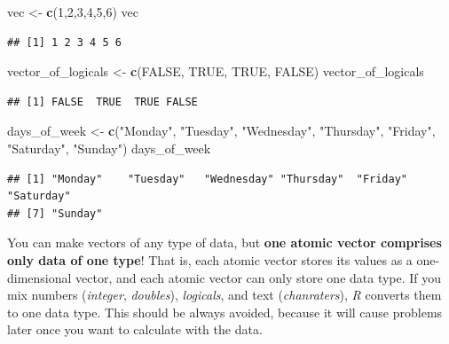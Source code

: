 \documentclass[
]{scrartcl}
\newenvironment{Shaded}{\begin{snugshade}}{\end{snugshade}}
\newcommand{\DecValTok}[1]{\textcolor[rgb]{0.00,0.00,0.81}{#1}}
\newcommand{\KeywordTok}[1]{\textcolor[rgb]{0.13,0.29,0.53}{\textbf{#1}}}
\newcommand{\NormalTok}[1]{#1}
\newcommand{\OtherTok}[1]{\textcolor[rgb]{0.56,0.35,0.01}{#1}}
\newcommand{\StringTok}[1]{\textcolor[rgb]{0.31,0.60,0.02}{#1}}
\begin{document}
\begin{Shaded}
\begin{Highlighting}[]
\NormalTok{vec \textless{}{-}}\StringTok{ }\KeywordTok{c}\NormalTok{(}\DecValTok{1}\NormalTok{,}\DecValTok{2}\NormalTok{,}\DecValTok{3}\NormalTok{,}\DecValTok{4}\NormalTok{,}\DecValTok{5}\NormalTok{,}\DecValTok{6}\NormalTok{)}
\NormalTok{vec}
\end{Highlighting}
\end{Shaded}

\begin{verbatim}
## [1] 1 2 3 4 5 6
\end{verbatim}

\begin{Shaded}
\begin{Highlighting}[]
\NormalTok{vector\_of\_logicals  \textless{}{-}}\StringTok{ }\KeywordTok{c}\NormalTok{(}\OtherTok{FALSE}\NormalTok{, }\OtherTok{TRUE}\NormalTok{, }\OtherTok{TRUE}\NormalTok{, }\OtherTok{FALSE}\NormalTok{)}
\NormalTok{vector\_of\_logicals}
\end{Highlighting}
\end{Shaded}

\begin{verbatim}
## [1] FALSE  TRUE  TRUE FALSE
\end{verbatim}

\begin{Shaded}
\begin{Highlighting}[]
\NormalTok{days\_of\_week \textless{}{-}}\StringTok{ }\KeywordTok{c}\NormalTok{(}\StringTok{"Monday"}\NormalTok{, }\StringTok{"Tuesday"}\NormalTok{, }\StringTok{"Wednesday"}\NormalTok{, }\StringTok{"Thursday"}\NormalTok{, }\StringTok{"Friday"}\NormalTok{,}
                \StringTok{"Saturday"}\NormalTok{, }\StringTok{"Sunday"}\NormalTok{)}
\NormalTok{days\_of\_week}
\end{Highlighting}
\end{Shaded}

\begin{verbatim}
## [1] "Monday"    "Tuesday"   "Wednesday" "Thursday"  "Friday"    "Saturday" 
## [7] "Sunday"
\end{verbatim}

You can make vectors of any type of data, but \textbf{one atomic vector comprises only data of one type}! That is, each atomic vector stores its values as a one-dimensional vector, and each atomic vector can only store one data type. If you mix numbers (\emph{integer}, \emph{doubles}), \emph{logicals}, and text (\emph{chanraters}), \emph{R} converts them to one data type. This should be always avoided, because it will cause problems later once you want to calculate with the data.
\end{document}
